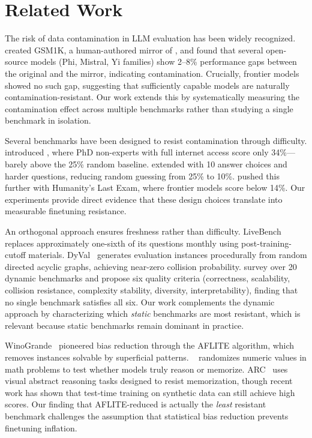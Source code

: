 \section{Related Work}
\label{sec:related}

 The risk of data contamination in LLM evaluation has been widely recognized. \citet{zhang2024gsm1k} created GSM1K, a human-authored mirror of \gsmk, and found that several open-source models (Phi, Mistral, Yi families) show 2--8\% performance gaps between the original and the mirror, indicating contamination. Crucially, frontier models showed no such gap, suggesting that sufficiently capable models are naturally contamination-resistant. Our work extends this by systematically measuring the contamination effect across multiple benchmarks rather than studying a single benchmark in isolation.

 Several benchmarks have been designed to resist contamination through difficulty. \citet{rein2023gpqa} introduced \gpqa, where PhD non-experts with full internet access score only 34\%---barely above the 25\% random baseline. \citet{tiglab2024mmlupro} extended \mmlu with 10 answer choices and harder questions, reducing random guessing from 25\% to 10\%. \citet{phan2025hle} pushed this further with Humanity's Last Exam, where frontier models score below 14\%. Our experiments provide direct evidence that these design choices translate into measurable finetuning resistance.

 An orthogonal approach ensures freshness rather than difficulty. LiveBench~\citep{white2024livebench} replaces approximately one-sixth of its questions monthly using post-training-cutoff materials. DyVal~\citep{zhu2023dyval} generates evaluation instances procedurally from random directed acyclic graphs, achieving near-zero collision probability. \citet{zhu2024contamination_survey} survey over 20 dynamic benchmarks and propose six quality criteria (correctness, scalability, collision resistance, complexity stability, diversity, interpretability), finding that no single benchmark satisfies all six. Our work complements the dynamic approach by characterizing which \emph{static} benchmarks are most resistant, which is relevant because static benchmarks remain dominant in practice.

 WinoGrande~\citep{sakaguchi2019winogrande} pioneered bias reduction through the AFLITE algorithm, which removes instances solvable by superficial patterns. \gsmsym~\citep{mirzadeh2025gsmsymbolic} randomizes numeric values in math problems to test whether models truly reason or memorize. ARC~\citep{chollet2019arc} uses visual abstract reasoning tasks designed to resist memorization, though recent work has shown that test-time training on synthetic data can still achieve high scores. Our finding that AFLITE-reduced \wino is actually the \emph{least} resistant benchmark challenges the assumption that statistical bias reduction prevents finetuning inflation.

